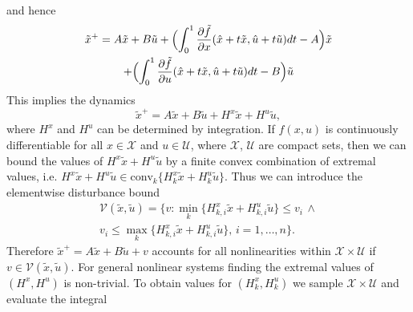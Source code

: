 \documentclass[letterpaper, 10pt, conference]{ieeeconf} %
\providecommand{\conv}{\text{conv}}
\begin{document}
and hence
\begin{multline*}
\tilde x^+ = A\tilde{x} + B \tilde{u} +\Bigl(
\int_0^1\frac{\partial\tilde f}{\partial x}(\hat x + t\tilde x,\hat u
             + t\tilde{u})dt - A \Bigr)\tilde x 
\\ 
+\Bigl(\int_0^1\frac{\partial\tilde f}{\partial u}(\hat x +
  t\tilde x,\hat u + t\tilde{u})dt - B\Bigr)\tilde{u}
\end{multline*}
%
This implies the dynamics
%
\[
\tilde x^+ = A\tilde x+B\tilde{u} + H^x\tilde{x} + H^u \tilde{u}, 
\]
%
where $H^x$ and $H^u$ can be determined by integration. 
If $f(x,u)$ is
continuously differentiable for all $x\in\mathcal X$ and $u\in\mathcal U$, where
$\mathcal X$, $\mathcal U$ are compact sets, then
we can bound the values of $H^x \tilde{x}+ H^u \tilde{u}$ by a finite convex combination of extremal values, i.e. 
$H^x \tilde{x}+H^u \tilde{u}\in\conv_k\{H^x_k \tilde{x} + H^u_k \tilde{u}\}$.
Thus we can introduce the element\-wise disturbance bound 
%
\begin{multline}\label{eq:definition:element:wise:constraints:on:nonlinearities}
\mathcal V(\tilde{x},\tilde{u})=\biggl\{v:\min_k\{
H^x_{k,i}\tilde{x}+H^u_{k,i}\tilde{u}\}\leq v_i\,\wedge 
\\ 
v_i \leq \max_k\{H^x_{k,i}\tilde{x}+H^u_{k,i}\tilde{u}\}, \, i =1,\dots,n\biggr\}.
\end{multline}
%
Therefore $\tilde x^+ = A\tilde x + B\tilde u + v$ accounts for all nonlinearities within $\mathcal X
\times\mathcal U$ if $v\in\mathcal V(\tilde x,\tilde u)$. For general nonlinear systems
finding the extremal values of $(H^x,H^u)$ is non-trivial.
To obtain values for $(H^x_k,H^u_k)$ we sample $\mathcal X\times\mathcal U$ and evaluate the integral 
\end{document}
